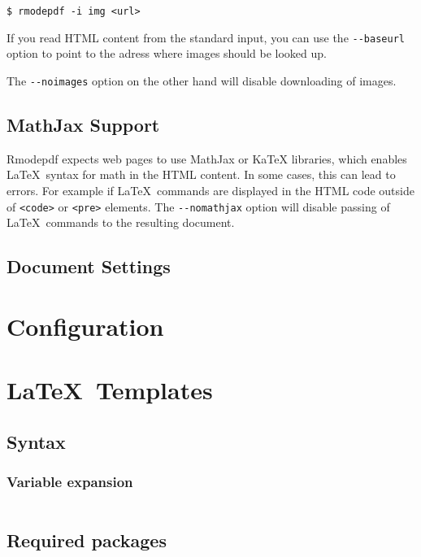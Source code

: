 \documentclass{article}
\begin{document}
\begin{verbatim}
$ rmodepdf -i img <url>
\end{verbatim}

If you read HTML content from the standard input, you can use the \verb|--baseurl| option to  
point to the adress where images should be looked up.

The \verb|--noimages| option on the other hand will disable downloading of images.

\subsection{MathJax Support}

Rmodepdf expects web pages to use MathJax or KaTeX libraries, which enables \LaTeX\ syntax for math 
in the HTML content. In some cases, this can lead to errors. For example if  \LaTeX\ commands are 
displayed in the HTML code outside of \verb|<code>| or \verb|<pre>| elements. The \verb|--nomathjax| option
will disable passing of \LaTeX\ commands to the resulting document.


\subsection{Document Settings}

\section{Configuration}

\section{\LaTeX\ Templates}


\subsection{Syntax}

\subsubsection{Variable expansion}

\begin{verbatim}
\end{verbatim}

\subsection{Required packages}
\end{document}
